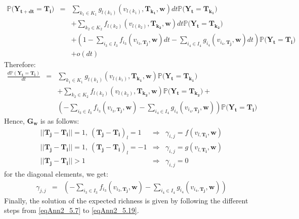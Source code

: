 \begin{eqnarray}
\nonumber \mathbb{P}(\mathbf{Y_{t+dt} = \mathbf{T_i})} &=& \sum_{k_1 \in K_1}g_{l(k_1)}(v_{l(k_1)},\mathbf{T_{k_1}}, \mathbf{w})dt\mathbb{P}(\mathbf{Y_{t}=\mathbf{T_{k_1}})} \\
\nonumber  & & + \sum_{k_2 \in K_2} f_{l(k_2)}(v_{l(k_2)},\mathbf{T_{k_2}}, \mathbf{w}) dt \mathbb{P}(\mathbf{Y_{t}}=\mathbf{T_{k_2})} \\
\nonumber  & & + \left(1-\sum_{i_3 \in I_3}f_{i_3}(v_{i_3,\mathbf{T_j}}, \mathbf{w})dt- \sum_{i_4 \in I_4}g_{i_4}(v_{i_4,\mathbf{T_j}}, \mathbf{w})dt \right)\mathbb{P}(\mathbf{Y_{t}=\mathbf{T_i})} \\
  & & + o(dt)
\end{eqnarray}
Therefore:
\begin{eqnarray}
\nonumber \frac{d\mathbb{P}(\mathbf{Y_{t}}=\mathbf{T_i})}{dt} &=& \sum_{k_1 \in K_1}g_{l(k_1)}(v_{l(k_1)},\mathbf{T_{k_1}}, \mathbf{w})\mathbb{P}(\mathbf{Y_{t}=\mathbf{T_{k_1}})} \\
 \nonumber & & + \sum_{k_2 \in K_2} f_{l(k_2)}(v_{l(k_2)},\mathbf{T_{k_2}}, \mathbf{w}) \mathbb{P}(\mathbf{Y_{t}}=\mathbf{T_{k_2})} + \\
 & & \left(-\sum_{i_3 \in I_3}f_{i_3}(v_{i_3,\mathbf{T_j}}, \mathbf{w})- \sum_{i_4 \in I_4}g_{i_4}(v_{i_4,\mathbf{T_j}}, \mathbf{w}) \right)\mathbb{P}(\mathbf{Y_{t}=\mathbf{T_i})}
\end{eqnarray}
Hence, $\mathbf{G_w}$ is as follows:
\begin{eqnarray}
||\mathbf{T_j}-\mathbf{T_i}|| = 1, ~ (\mathbf{T_j-T_i})_l=1 &\Rightarrow& \gamma_{i,j}= f(v_{l,\mathbf{T_i}}, \mathbf{w}) \\
||\mathbf{T_j}-\mathbf{T_i}||  =1  ,~ (\mathbf{T_j-T_i})_l=-1&\Rightarrow& \gamma_{i,j}= g(v_{l,\mathbf{T_i}}, \mathbf{w}) \\
||\mathbf{T_j}-\mathbf{T_i}||  >1 &\Rightarrow& \gamma_{i,j}=0
\end{eqnarray}
for the diagonal elements, we get:
\begin{eqnarray}
\gamma_{j,j} &=& \left(-\sum_{i_3 \in I_3}f_{i_3}(v_{i_3,\mathbf{T_j}}, \mathbf{w})- \sum_{i_4 \in I_4}g_{i_4}(v_{i_4,\mathbf{T_j}}, \mathbf{w}) \right)
\end{eqnarray}
Finally, the solution of the expected richness is given by following the different steps from \eqref{eqAnn2_5.7} to \eqref{eqAnn2_5.19}.
